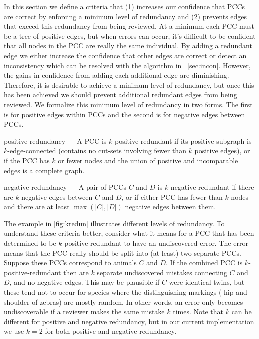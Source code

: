 In this section we define a criteria that
(1) increases our confidence that PCCs are correct by enforcing a minimum level of redundancy and
(2) prevents edges that exceed this redundancy from being reviewed.
At a minimum each PCC must be a tree of positive edges, but when errors can occur, it's difficult to be confident
  that all nodes in the PCC are really the same individual.
By adding a redundant edge we either increase the confidence that other edges are correct or detect an
  inconsistency which can be resolved with the algorithm in ~\cref{sec:incon}.
However, the gains in confidence from adding each additional edge are diminishing.
Therefore, it is desirable to achieve a minimum level of redundancy, but once this has been achieved we should
  prevent additional redundant edges from being reviewed.
We formalize this minimum level of redundancy in two forms.
The first is for positive edges within PCCs and the second is for negative edges between PCCs.
\begin{enumln}

    \item positive-redundancy --- %
        A PCC is $k$-positive-redundant if its positive subgraph is $k$-edge-connected (contains no cut-sets
          involving fewer than $k$ positive edges\cite{eswaran_augmentation_1976}), or if the PCC has $k$ or fewer
          nodes and the union of positive and incomparable edges is a complete graph.

    \item negative-redundancy --- %
        A pair of PCCs $C$ and $D$ is $k$-negative-redundant if there are $k$ negative edges between $C$ and $D$,
        or if either PCC has fewer than $k$ nodes and there are at least $\mathop{max}(|C|, |D|)$ negative edges
        between them.
        

\end{enumln}
\kredun{}

The example in \cref{fig:kredun} illustrates different levels of redundancy.
To understand these criteria better, consider what it means for a PCC that has been determined to be
  $k$-positive-redundant to have an undiscovered error.
The error means that the PCC really should be split into (at least) two separate PCCs.
Suppose these PCCs correspond to animals $C$ and $D$.
If the combined PCC is $k$-positive-redundant then are $k$ separate undiscovered mistakes connecting $C$ and $D$,
  and no negative edges.
This may be plausible if $C$ were identical twins, but these tend not to occur for species where the
  distinguishing markings (\eg{} hip and shoulder of zebras) are mostly random.
In other words, an error only becomes undiscoverable if a reviewer makes the same mistake $k$ times.
Note that $k$ can be different for positive and negative redundancy, but in our current implementation we use
  $k=2$ for both positive and negative redundancy.


